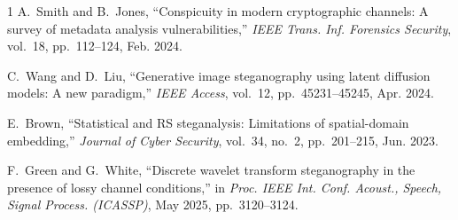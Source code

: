 \documentclass[conference]{IEEEtran}
\begin{document}
\begin{thebibliography}{1}
A.~Smith and B.~Jones, ``Conspicuity in modern cryptographic channels: A
  survey of metadata analysis vulnerabilities,'' \emph{IEEE Trans. Inf.
  Forensics Security}, vol.~18, pp.~112--124, Feb. 2024.

C.~Wang and D.~Liu, ``Generative image steganography using latent diffusion
  models: A new paradigm,'' \emph{IEEE Access}, vol.~12, pp.~45231--45245,
  Apr. 2024.

E.~Brown, ``Statistical and RS steganalysis: Limitations of spatial-domain
  embedding,'' \emph{Journal of Cyber Security}, vol.~34, no.~2, pp.~201--215,
  Jun. 2023.

F.~Green and G.~White, ``Discrete wavelet transform steganography in the
  presence of lossy channel conditions,'' in \emph{Proc. IEEE Int. Conf.
  Acoust., Speech, Signal Process. (ICASSP)}, May 2025, pp.~3120--3124.

\end{thebibliography}
\end{document}
